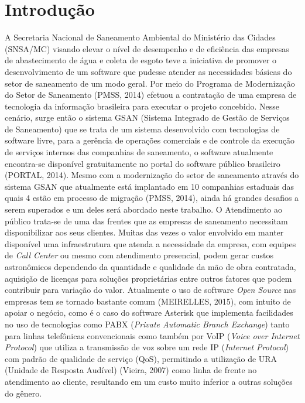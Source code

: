 \chapter*[Introdução]{Introdução}



A Secretaria Nacional de Saneamento Ambiental do Ministério das Cidades (SNSA/MC) visando elevar o nível de desempenho e de eficiência das empresas de abastecimento de água e coleta de esgoto teve a iniciativa de promover o desenvolvimento de um software que pudesse atender as necessidades básicas do setor de saneamento de um modo geral. Por meio do Programa de Modernização do Setor de Saneamento (PMSS, 2014) efetuou a contratação de uma empresa de tecnologia da informação brasileira para executar o projeto concebido.  Nesse cenário, surge então o sistema GSAN (Sistema Integrado de Gestão de Serviços de Saneamento) que se trata de um sistema desenvolvido com tecnologias de software livre, para a gerência de operações comerciais e de controle da execução de serviços internos das companhias de saneamento, o software atualmente encontra-se disponível gratuitamente no portal do software público brasileiro (PORTAL, 2014). Mesmo com a modernização do setor de saneamento através do sistema GSAN que atualmente está implantado em 10 companhias estaduais das quais 4 estão em processo de migração (PMSS, 2014), ainda há grandes desafios a serem superados e um deles será abordado neste trabalho.
O Atendimento ao público trata-se de uma das frentes que as empresas de saneamento necessitam disponibilizar aos seus clientes. Muitas das vezes o valor envolvido em manter disponível uma infraestrutura que atenda a necessidade da empresa, com equipes de \textit{Call Center} ou mesmo com atendimento presencial, podem gerar custos astronômicos dependendo da quantidade e qualidade da mão de obra contratada, aquisição de licenças para soluções proprietárias entre outros fatores que podem contribuir para variação do valor. Atualmente o uso de software \textit{Open Source} nas empresas tem se tornado bastante comum (MEIRELLES, 2015), com intuito de apoiar o negócio, como é o caso do software Asterisk que implementa facilidades no uso de tecnologias como PABX (\textit{Private Automatic Branch Exchange})  tanto para linhas telefônicas convencionais como também por VoIP (\textit{Voice over Internet Protocol}) que utiliza a transmissão de voz sobre um rede IP (\textit{Internet Protocol}) com padrão de qualidade de serviço (QoS), permitindo a utilização de URA (Unidade de Resposta Audível) (Vieira, 2007) como linha de frente no atendimento ao cliente, resultando em um custo muito inferior a outras soluções do gênero.


